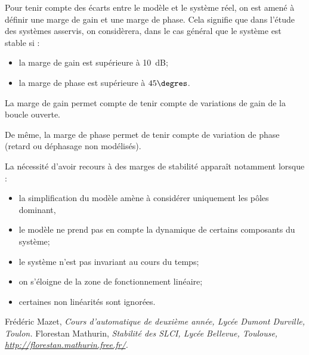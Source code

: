 \documentclass[10pt,fleqn]{article} %
\begin{document}
\begin{resultat}[Marges]
Pour tenir compte des écarts entre le modèle et le système réel, on est amené à définir une marge de gain et une marge de phase. Cela signifie que dans l'étude des systèmes asservis, on considèrera, dans le cas général que le système est stable si :
\begin{itemize}
\item la marge de gain est supérieure à \SI{10}{dB};
\item la marge de phase est supérieure à $45\degres$.
\end{itemize}
\end{resultat}
 
La marge de gain permet compte de tenir compte de variations de gain de la boucle ouverte. 

De même, la marge de phase permet de tenir compte de variation de phase (retard ou déphasage non modélisés). 

La nécessité d'avoir recours à des marges de stabilité apparaît notamment lorsque : 
\begin{itemize}
\item la simplification du modèle amène à considérer uniquement les pôles dominant, 
\item le modèle ne prend pas en compte la dynamique de certains composants du système;
\item le système n'est pas invariant au cours du temps;
\item on s'éloigne de la zone de fonctionnement linéaire;
\item certaines non linéarités sont ignorées.
\end{itemize}

\begin{thebibliography}{2}
    Frédéric Mazet, {\it Cours d'automatique de deuxième année, Lycée Dumont Durville, Toulon.}
       Florestan Mathurin, {\it Stabilité des SLCI, Lycée Bellevue, Toulouse, \url{http://florestan.mathurin.free.fr/}.}



\end{thebibliography}
\end{document}

